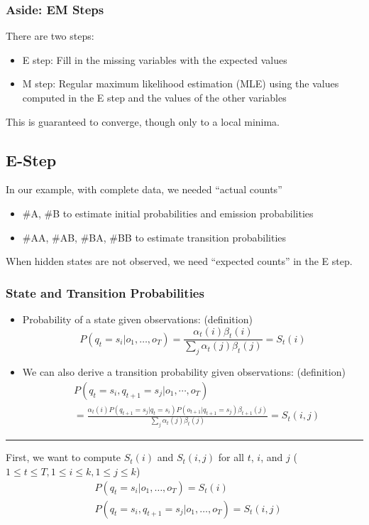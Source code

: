 \documentclass[10pt]{article}
\begin{document}
\subsubsection*{Aside: EM Steps}
There are two steps:
\begin{itemize}
	\item E step: Fill in the missing variables with the expected values
	\item M step: Regular maximum likelihood estimation (MLE) using the values computed in the E step and the values of the other variables
\end{itemize}
This is guaranteed to converge, though only to a local minima.

\subsection*{E-Step}
In our example, with complete data, we needed ``actual counts''
\begin{itemize}
	\item \#A, \#B to estimate initial probabilities and emission probabilities
	\item \#AA, \#AB, \#BA, \#BB to estimate transition probabilities
\end{itemize}
When hidden states are not observed, we need ``expected counts'' in the E step.

\subsubsection*{State and Transition Probabilities}
\begin{itemize}
	\item Probability of a state given observations: (definition)
	\[P(q_t = s_i | o_1, \dots, o_T) = \frac{\alpha_t(i) \beta_t(i)}{\sum_j \alpha_t(j) \beta_t(j)} = S_t(i)\]
    \item We can also derive a transition probability given observations: (definition)
    \begin{align*}
    &P(q_t = s_i, q_{t + 1} = s_j | o_1, \cdots, o_T) \\
    &= \frac{\alpha_t(i) P(q_{t + 1} = s_j | q_t = s_i) P(o_{t + 1} | q_{t + 1} = s_j) \beta_{t + 1}(j)}{\sum_j \alpha_t(j) \beta_t(j)} = S_t(i, j)
    \end{align*}
\end{itemize}

\rule{\textwidth}{2pt}

First, we want to compute $S_t(i)$ and $S_t(i, j)$ for all $t$, $i$, and $j$ ($1 \leq t \leq T, 1 \leq i \leq k, 1 \leq j \leq k$) 
\begin{align*}
    &P(q_t = s_i | o_1, \dots, o_T) = S_t(i) \\
    &P(q_t = s_i, q_{t + 1} = s_j | o_1, \dots, o_T) = S_t(i, j)
\end{align*}
\end{document}
